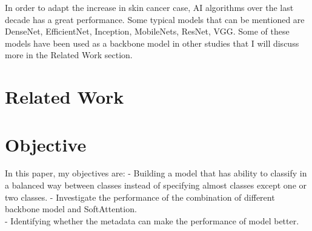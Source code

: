 In order to adapt the increase in skin cancer case, AI algorithms over the last decade has a great performance. Some typical models that can be mentioned are DenseNet\cite{06993}, EfficientNet\cite{11946}, Inception\cite{00567}, MobileNets\cite{04861}\cite{04381}\cite{02244}, ResNet\cite{03385}\cite{05027}, VGG\cite{1556}. Some of these models have been used as a backbone model in other studies that I will discuss more in the Related Work section. 

\section{Related Work}

\section{Objective}
In this paper, my objectives are: \newline
- Building a model that has ability to classify in a balanced way between classes instead of specifying almost classes except one or two classes. \newline
- Investigate the performance of the combination of different backbone model and SoftAttention. \\
- Identifying whether the metadata can make the performance of model better. \\

